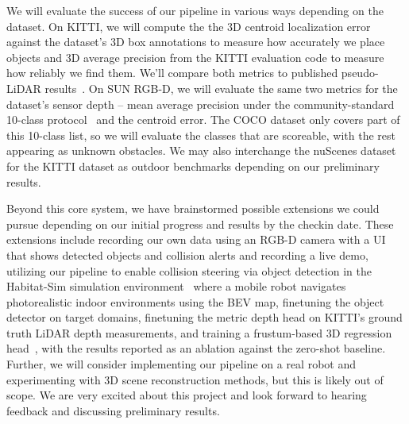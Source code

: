 \documentclass[
  12pt,
]{fphw}
\begin{document}
We will evaluate the success of our pipeline in various ways depending on the dataset. On KITTI, we will
compute the the 3D centroid localization error against the dataset's 3D box annotations to measure how
accurately we place objects and 3D average precision from the KITTI evaluation code to measure how
reliably we find them. We'll compare both metrics to published pseudo-LiDAR results~\cite{pseudolidar}. On
SUN RGB-D, we will evaluate the same two metrics for the dataset's sensor depth -- mean average precision
under the community-standard 10-class protocol~\cite{votenet} and the centroid error. The COCO dataset
only covers part of this 10-class list, so we will evaluate the classes that are scoreable, with the rest
appearing as unknown obstacles. We may also interchange the nuScenes dataset~\cite{nuscenes} for the KITTI
dataset as outdoor benchmarks depending on our preliminary results.

Beyond this core system, we have brainstormed possible extensions we could pursue depending on our initial
progress and results by the checkin date. These extensions include recording our own data using an RGB-D
camera with a UI that shows detected objects and collision alerts and recording a live demo, utilizing our
pipeline to enable collision steering via object detection in the Habitat-Sim simulation
environment~\cite{habitat} where a mobile robot navigates photorealistic indoor environments using the BEV
map, finetuning the object detector on target domains, finetuning the metric depth head on KITTI's ground
truth LiDAR depth measurements, and training a frustum-based 3D regression head~\cite{frustum}, with the
results reported as an ablation against the zero-shot baseline. Further, we will consider implementing our
pipeline on a real robot and experimenting with 3D scene reconstruction methods, but this is likely out of
scope. We are very excited about this project and look forward to hearing feedback and discussing
preliminary results.

\end{document}
